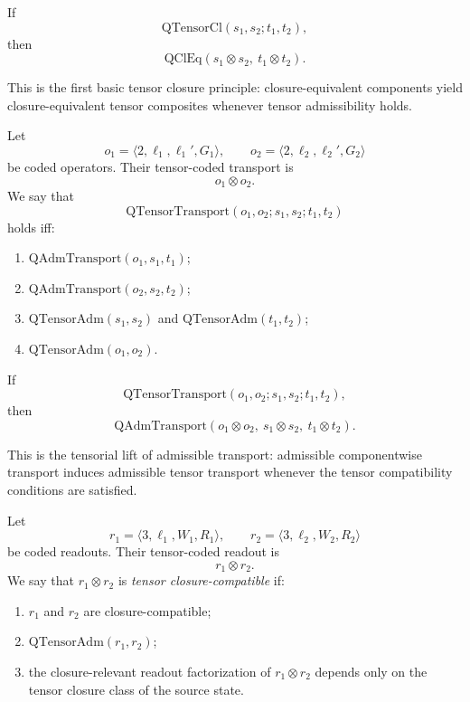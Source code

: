 \begin{axiom}
If
\[
\mathrm{QTensorCl}(s_1,s_2;t_1,t_2),
\]
then
\[
\mathrm{QClEq}(s_1\otimes s_2,\ t_1\otimes t_2).
\]
\end{axiom}

\begin{remark}
This is the first basic tensor closure principle: closure-equivalent components yield closure-equivalent tensor composites whenever tensor admissibility holds.
\end{remark}

\begin{definition}
Let
\[
o_1=\langle 2,\ell_1,\ell_1',G_1\rangle,
\qquad
o_2=\langle 2,\ell_2,\ell_2',G_2\rangle
\]
be coded operators. Their tensor-coded transport is
\[
o_1\otimes o_2.
\]
We say that
\[
\mathrm{QTensorTransport}(o_1,o_2;s_1,s_2;t_1,t_2)
\]
holds iff:
\begin{enumerate}
\item $\mathrm{QAdmTransport}(o_1,s_1,t_1)$;
\item $\mathrm{QAdmTransport}(o_2,s_2,t_2)$;
\item $\mathrm{QTensorAdm}(s_1,s_2)$ and $\mathrm{QTensorAdm}(t_1,t_2)$;
\item $\mathrm{QTensorAdm}(o_1,o_2)$.
\end{enumerate}
\end{definition}

\begin{axiom}
If
\[
\mathrm{QTensorTransport}(o_1,o_2;s_1,s_2;t_1,t_2),
\]
then
\[
\mathrm{QAdmTransport}(o_1\otimes o_2,\ s_1\otimes s_2,\ t_1\otimes t_2).
\]
\end{axiom}

\begin{remark}
This is the tensorial lift of admissible transport: admissible componentwise transport induces admissible tensor transport whenever the tensor compatibility conditions are satisfied.
\end{remark}

\begin{definition}
Let
\[
r_1=\langle 3,\ell_1,W_1,R_1\rangle,
\qquad
r_2=\langle 3,\ell_2,W_2,R_2\rangle
\]
be coded readouts. Their tensor-coded readout is
\[
r_1\otimes r_2.
\]
We say that $r_1\otimes r_2$ is \emph{tensor closure-compatible} if:
\begin{enumerate}
\item $r_1$ and $r_2$ are closure-compatible;
\item $\mathrm{QTensorAdm}(r_1,r_2)$;
\item the closure-relevant readout factorization of $r_1\otimes r_2$ depends only on the tensor closure class of the source state.
\end{enumerate}
\end{definition}

